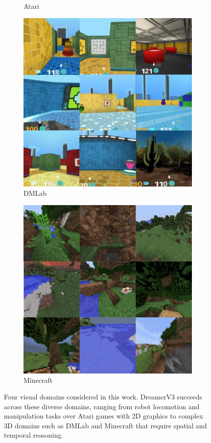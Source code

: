\begin{figure}[t]
\begin{subfigure}{.22\textwidth}
\caption{Atari}
\end{subfigure}\hfill
\begin{subfigure}{.22\textwidth}
\includegraphics[width=\linewidth]{tasks/dmlab}
\caption{DMLab}
\end{subfigure}\hfill
\begin{subfigure}{.22\textwidth}
\includegraphics[width=\linewidth]{tasks/minecraft}
\caption{Minecraft}
\end{subfigure}
\caption{Four visual domains considered in this work. DreamerV3 succeeds across these diverse domains, ranging from robot locomotion and manipulation tasks over Atari games with 2D graphics to complex 3D domains such as DMLab and Minecraft that require spatial and temporal reasoning.}
\label{fig:tasks}
\end{figure}
